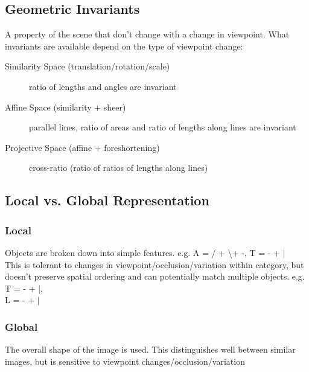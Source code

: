 \subsection{Geometric Invariants}
A property of the scene that don't change with a change in viewpoint. What invariants are available depend on the type of viewpoint change:
\begin{description}
    \item[Similarity Space (translation/rotation/scale)] ratio of lengths and angles are invariant
    \item[Affine Space (similarity + sheer)] parallel lines, ratio of areas and ratio of lengths along lines are invariant
    \item[Projective Space (affine + foreshortening)] cross-ratio (ratio of ratios of lengths along lines)
\end{description}

\subsection{Local vs. Global Representation}

\subsubsection{Local}
Objects are broken down into simple features. e.g. A = / + \textbackslash + -, T = - + $|$ \\
This is tolerant to changes in viewpoint/occlusion/variation within category, but doesn't preserve spatial ordering and can potentially match multiple objects. e.g. T = - + $|$,\\  L = - + $|$

\subsubsection{Global}
The overall shape of the image is used. This distinguishes well between similar images, but is sensitive to viewpoint changes/occlusion/variation

